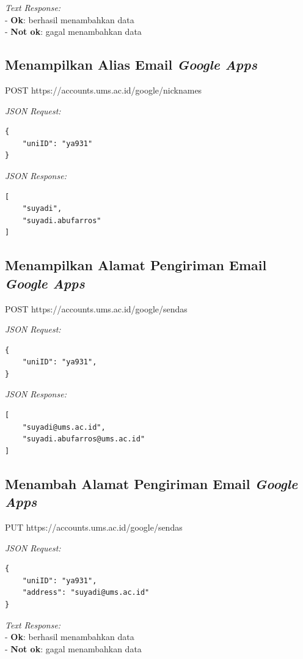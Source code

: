 \noindent
\textit{Text Response:}\\
- \textbf{Ok}: berhasil menambahkan data\\
-  \textbf{Not ok}: gagal menambahkan data

\subsection{Menampilkan Alias Email \textit{Google Apps}}

POST https://accounts.ums.ac.id/google/nicknames

\noindent
\textit{JSON Request:}
\begin{lstlisting}
{
    "uniID": "ya931"
}
\end{lstlisting}

\noindent
\textit{JSON Response:}
\begin{lstlisting}
[
    "suyadi",
    "suyadi.abufarros"
]
\end{lstlisting}

\subsection{Menampilkan Alamat Pengiriman Email \textit{Google Apps}}

POST https://accounts.ums.ac.id/google/sendas

\noindent
\textit{JSON Request:}
\begin{lstlisting}
{
    "uniID": "ya931",
}
\end{lstlisting}

\noindent
\textit{JSON Response:}
\begin{lstlisting}
[
    "suyadi@ums.ac.id",
    "suyadi.abufarros@ums.ac.id"
]
\end{lstlisting}

\subsection{Menambah Alamat Pengiriman Email \textit{Google Apps}}

PUT https://accounts.ums.ac.id/google/sendas

\noindent
\textit{JSON Request:}
\begin{lstlisting}
{
    "uniID": "ya931",
    "address": "suyadi@ums.ac.id"
}
\end{lstlisting}

\noindent
\textit{Text Response:}\\
- \textbf{Ok}: berhasil menambahkan data\\
-  \textbf{Not ok}: gagal menambahkan data

